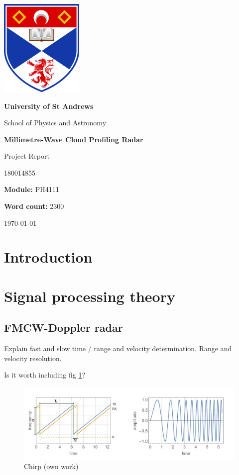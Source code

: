 \documentclass{article}
\title {\mytitle}
\author{\myauthor}
\date  {\mydate}
\newcommand\mytitle    {Millimetre-Wave Cloud Profiling Radar}
\newcommand\mysubtitle {Project Report}
\newcommand\myauthor   {180014855}
\newcommand\mymodule   {PH4111}
\newcommand\mywordcount{2300}
\begin{document}
\begin{titlepage}
	\centering
	{\includegraphics[width=0.3\textwidth]{uos-logo}}
	\par
	{\LARGE\bfseries University of St Andrews\par}
	{\LARGE School of Physics and Astronomy\par}
	\vspace{1.5cm}
	{\huge\bfseries\mytitle\par}
	{\Large\mysubtitle\par}
	\vspace{2cm}
	{\Large\myauthor\par}
	{\large\textbf{Module:} \mymodule\par}
	{\large\textbf{Word count:} \mywordcount\par}
	\vfill
	{\large\today\par}
\end{titlepage}

\begin{abstract}
	Insert abstract here.
\end{abstract}

\tableofcontents

\section{Introduction}

\section{Signal processing theory}
\subsection{FMCW-Doppler radar}
Explain fast and slow time / range and velocity determination. Range and velocity resolution.

Is it worth including fig \ref{fig:Chirp}?
\begin{figure}
	\centering
	\includegraphics[width=\textwidth]{chirp}
	\caption{Chirp (own work)}
	\label{fig:Chirp}
\end{figure}
\end{document}
